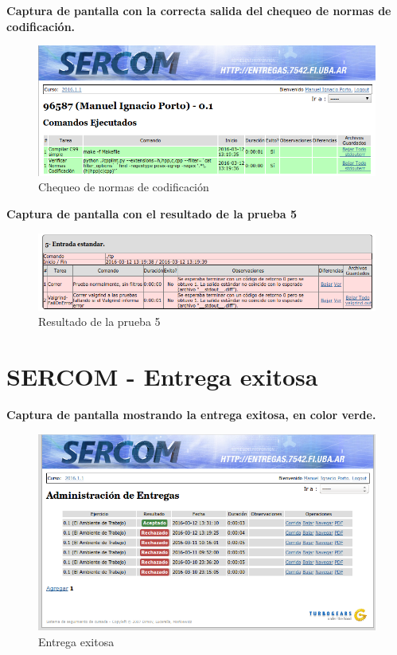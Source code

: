 \documentclass{article}
\begin{document}
\textbf{Captura de pantalla con la correcta salida del chequeo de normas de codificación.}

    \begin{figure}[H]
        \includegraphics[width=\columnwidth]{p6_style}
        \caption{Chequeo de normas de codificación}
    \end{figure}
\textbf{Captura de pantalla con el resultado de la prueba 5}

    \begin{figure}[H]
        \includegraphics[width=\columnwidth]{p6_test5}
        \caption{Resultado de la prueba 5}
    \end{figure}

\section{SERCOM - Entrega exitosa}

\textbf{Captura de pantalla mostrando la entrega exitosa, en color verde.}
    \begin{figure}[H]
        \includegraphics[width=\columnwidth]{p7_result}
        \caption{Entrega exitosa}
    \end{figure}
    
\end{document}
